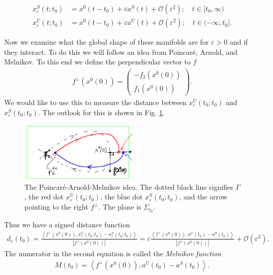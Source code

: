 \begin{align}
	x_{\varepsilon}^{S}(t;t_0) &= x^{0}(t-t_0) + \varepsilon a^{S}(t) + \mathcal{O}(\varepsilon^{2} );\quad t\in [t_0,\infty ) \\
	x_{\varepsilon}^{U}(t;t_0) &= x^{0}(t-t_0) + \varepsilon a^{U}(t) + \mathcal{O}(\varepsilon^{2} );\quad t\in (-\infty, t_0].
\end{align}

Now we examine what the global shape of these manifolds are for $\varepsilon>0$ and if they interact. To do this we will follow an idea from Poincaré, Arnold, and Melnikov. To this end we define the perpendicular vector to $f$ 
\begin{align}
	f^{\perp}(x^{0}(0)) = 
	\begin{pmatrix}
		-f_2(x^{0}(0)) \\ f_1 (x^{0}(0))
	\end{pmatrix}
	.
\end{align}
We would like to use this to measure the distance between $x^{U}_{\varepsilon}(t_0;t_0)$ and $x^{S}_{\varepsilon}(t_0;t_0)$. The outlook for this is shown in Fig. \ref{fig:PAM_idea}.
\begin{figure}[h!]
	\centering
	\includegraphics[width=0.5\textwidth]{figures/ch6/10PAM_idea.png}
	\caption{The Poincaré-Arnold-Melnikov idea. The dotted black line signifies $\Gamma$, the red dot $x^{U}_{\varepsilon}(t_0;t_0)$, the blue dot $x^{S}_{\varepsilon}(t_0;t_0)$, and the arrow pointing to the right $f^{\perp}$. The plane is $\Sigma_{t_0}$.}
	\label{fig:PAM_idea}
\end{figure}
Thus we have a signed distance function
\begin{align}
	d_{\varepsilon}(t_0) = \frac{\left\langle f^{\perp}(x^{0}(0)), x^{U}_{\varepsilon}(t_0; t_0) - x^{S}_{\varepsilon}(t_0; t_0)\right\rangle}{\left| f^{\perp}(x^{0}(0))\right|} 
	= \varepsilon  \frac{\left\langle f^{\perp}(x^{0}(0)), a^{U}(t_0) - a^{S}(t_0) \right\rangle}{\left| f^{\perp}(x^{0}(0))\right|} + \mathcal{O}(\varepsilon^2).
\end{align}
The numerator in the second equation is called the \emph{Melnikov function}
\begin{align}
	M(t_0)=\left\langle f^{\perp}(x^{0}(0)), a^{U}(t_0) - a^{S}(t_0) \right\rangle	.
\end{align}
